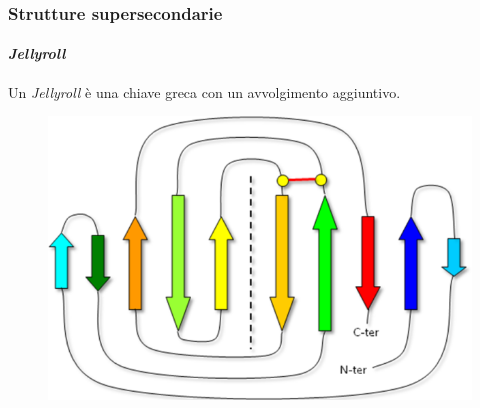 \documentclass{beamer}
\begin{document}
\begin{frame}\frametitle{Strutture supersecondarie}
  \framesubtitle{\itshape{Jellyroll}}
Un \emph{Jellyroll} è una chiave greca con un avvolgimento aggiuntivo.   \begin{figure}
\centering
\includegraphics[scale=0.25]{jellyroll.png}
\end{figure}

\end{frame}
\end{document}
